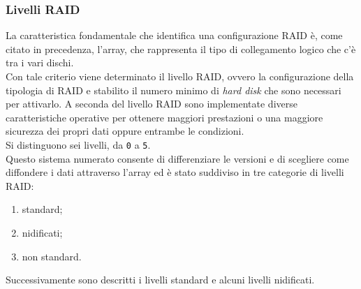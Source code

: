 \item
\subsubsection{Livelli RAID}
La caratteristica fondamentale che identifica una configurazione RAID \`{e}, come citato in precedenza, l'array, che rappresenta il tipo di collegamento logico che c'\`{e} tra i vari dischi.\\
Con tale criterio viene determinato il livello RAID, ovvero la configurazione della tipologia di RAID  e stabilito il numero minimo di \textit{hard disk} che sono necessari per attivarlo. A seconda del livello RAID sono implementate diverse caratteristiche operative per ottenere maggiori prestazioni o una maggiore sicurezza dei propri dati oppure entrambe le condizioni.\\

Si distinguono sei livelli, da \verb"0" a \verb"5".\\
Questo sistema numerato consente di differenziare le versioni e di scegliere come diffondere i dati attraverso l'array ed \`{e} stato suddiviso in tre categorie di livelli RAID: 
\begin{enumerate}
\item 
standard;
\item
nidificati;
\item
non standard\cite{etichetta9}.
\end{enumerate}

Successivamente sono descritti i livelli standard e alcuni livelli nidificati.


